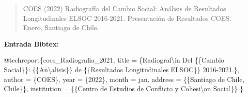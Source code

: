 \documentclass[
  12pt,
]{book}
\newenvironment{Shaded}{\begin{snugshade}}{\end{snugshade}}
\newcommand{\NormalTok}[1]{#1}
\newcommand{\OtherTok}[1]{\textcolor[rgb]{0.56,0.35,0.01}{#1}}
\newcommand{\SpecialCharTok}[1]{\textcolor[rgb]{0.00,0.00,0.00}{#1}}
\newcommand{\StringTok}[1]{\textcolor[rgb]{0.31,0.60,0.02}{#1}}
\begin{document}
\begin{quote}
COES (2022) Radiografía del Cambio Social: Análisis de Resultados Longitudinales ELSOC 2016-2021. Presentación de Resultados COES. Enero, Santiago de Chile.
\end{quote}

\textbf{Entrada Bibtex:}

\begin{Shaded}
\begin{Highlighting}[]
\SpecialCharTok{@}\NormalTok{techreport\{coes\_Radiografia\_2021,}
\NormalTok{  title }\OtherTok{=}\NormalTok{ \{Radiograf\textbackslash{}}\StringTok{\textquotesingle{}ia Del \{\{Cambio Social\}\}: \{\{An}\SpecialCharTok{\textbackslash{}\textquotesingle{}}\StringTok{alisis\}\} de \{\{Resultados Longitudinales ELSOC\}\} 2016{-}2021.\},}
\StringTok{  author = \{COES\},}
\StringTok{  year = \{2022\},}
\StringTok{  month = jan,}
\StringTok{  address = \{\{Santiago de Chile, Chile\}\},}
\StringTok{  institution = \{\{Centro de Estudios de Conflicto y Cohesi}\SpecialCharTok{\textbackslash{}\textquotesingle{}}\StringTok{on Social\}\}}
\StringTok{\}}
\end{Highlighting}
\end{Shaded}
\end{document}
